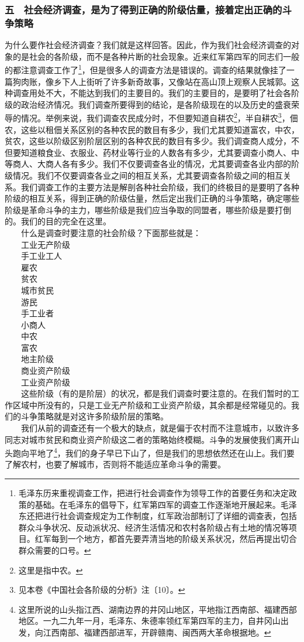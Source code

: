 \documentclass[cn,11pt,chinese]{elegantbook}
\def\myformat#1{\hfil\hfil #1}
\begin{document}
\subsubsection*{\myformat{五　社会经济调查，是为了得到正确的阶级估量，接着定出正确的斗争策略}}
为什么要作社会经济调查？我们就是这样回答。因此，作为我们社会经济调查的对象的是社会的各阶级，而不是各种片断的社会现象。近来红军第四军的同志们一般的都注意调查工作了\footnote[4]{ 毛泽东历来重视调查工作，把进行社会调查作为领导工作的首要任务和决定政策的基础。在毛泽东的倡导下，红军第四军的调查工作逐渐地开展起来。毛泽东还把进行社会调查规定为工作制度，红军政治部制订了详细的调查表，包括群众斗争状况、反动派状况、经济生活情况和农村各阶级占有土地的情况等项目。红军每到一个地方，都首先要弄清当地的阶级关系状况，然后再提出切合群众需要的口号。}，但是很多人的调查方法是错误的。调查的结果就像挂了一篇狗肉账，像乡下人上街听了许多新奇故事，又像站在高山顶上观察人民城郭。这种调查用处不大，不能达到我们的主要目的。我们的主要目的，是要明了社会各阶级的政治经济情况。我们调查所要得到的结论，是各阶级现在的以及历史的盛衰荣辱的情况。举例来说，我们调查农民成分时，不但要知道自耕农\footnote[5]{ 这里是指中农。}，半自耕农\footnote[6]{ 见本卷《中国社会各阶级的分析》注〔10〕。}，佃农，这些以租佃关系区别的各种农民的数目有多少，我们尤其要知道富农，中农，贫农，这些以阶级区别阶层区别的各种农民的数目有多少。我们调查商人成分，不但要知道粮食业、衣服业、药材业等行业的人数各有多少，尤其要调查小商人、中等商人、大商人各有多少。我们不仅要调查各业的情况，尤其要调查各业内部的阶级情况。我们不仅要调查各业之间的相互关系，尤其要调查各阶级之间的相互关系。我们调查工作的主要方法是解剖各种社会阶级，我们的终极目的是要明了各种阶级的相互关系，得到正确的阶级估量，然后定出我们正确的斗争策略，确定哪些阶级是革命斗争的主力，哪些阶级是我们应当争取的同盟者，哪些阶级是要打倒的。我们的目的完全在这里。\\
　　什么是调查时要注意的社会阶级？下面那些就是：\\
　　工业无产阶级\\
　　手工业工人\\
　　雇农\\
　　贫农\\
　　城市贫民\\
　　游民\\
　　手工业者\\
　　小商人\\
　　中农\\
　　富农\\
　　地主阶级\\
　　商业资产阶级\\
　　工业资产阶级\\
　　这些阶级（有的是阶层）的状况，都是我们调查时要注意的。在我们暂时的工作区域中所没有的，只是工业无产阶级和工业资产阶级，其余都是经常碰见的。我们的斗争策略就是对这许多阶级阶层的策略。\\
　　我们从前的调查还有一个极大的缺点，就是偏于农村而不注意城市，以致许多同志对城市贫民和商业资产阶级这二者的策略始终模糊。斗争的发展使我们离开山头跑向平地了\footnote[7]{ 这里所说的山头指江西、湖南边界的井冈山地区，平地指江西南部、福建西部地区。一九二九年一月，毛泽东、朱德率领红军第四军的主力，自井冈山出发，向江西南部、福建西部进军，开辟赣南、闽西两大革命根据地。}，我们的身子早已下山了，但是我们的思想依然还在山上。我们要了解农村，也要了解城市，否则将不能适应革命斗争的需要。\\
\end{document}
